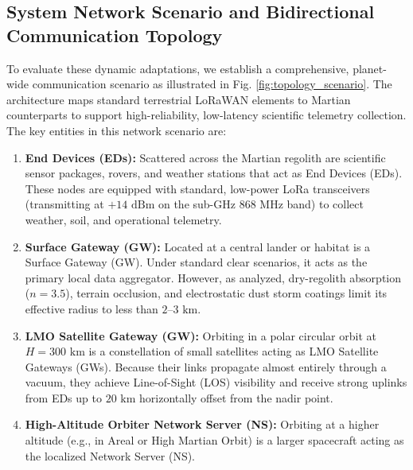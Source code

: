 \documentclass[journal,10pt,doublecolumn]{IEEEtran}
\begin{document}
\subsection{System Network Scenario and Bidirectional Communication Topology}
To evaluate these dynamic adaptations, we establish a comprehensive, planet-wide communication scenario as illustrated in Fig. \ref{fig:topology_scenario}. The architecture maps standard terrestrial LoRaWAN elements to Martian counterparts to support high-reliability, low-latency scientific telemetry collection. The key entities in this network scenario are:
\begin{enumerate}
    \item \textbf{End Devices (EDs):} Scattered across the Martian regolith are scientific sensor packages, rovers, and weather stations that act as End Devices (EDs). These nodes are equipped with standard, low-power LoRa transceivers (transmitting at $+14\text{ dBm}$ on the sub-GHz $868\text{ MHz}$ band) to collect weather, soil, and operational telemetry.
    \item \textbf{Surface Gateway (GW):} Located at a central lander or habitat is a Surface Gateway (GW). Under standard clear scenarios, it acts as the primary local data aggregator. However, as analyzed, dry-regolith absorption ($n=3.5$), terrain occlusion, and electrostatic dust storm coatings limit its effective radius to less than $2\text{--}3\text{ km}$.
    \item \textbf{LMO Satellite Gateway (GW):} Orbiting in a polar circular orbit at $H = 300\text{ km}$ is a constellation of small satellites acting as LMO Satellite Gateways (GWs). Because their links propagate almost entirely through a vacuum, they achieve Line-of-Sight (LOS) visibility and receive strong uplinks from EDs up to $20\text{ km}$ horizontally offset from the nadir point.
    \item \textbf{High-Altitude Orbiter Network Server (NS):} Orbiting at a higher altitude (e.g., in Areal or High Martian Orbit) is a larger spacecraft acting as the localized Network Server (NS). 
\end{enumerate}
\end{document}

